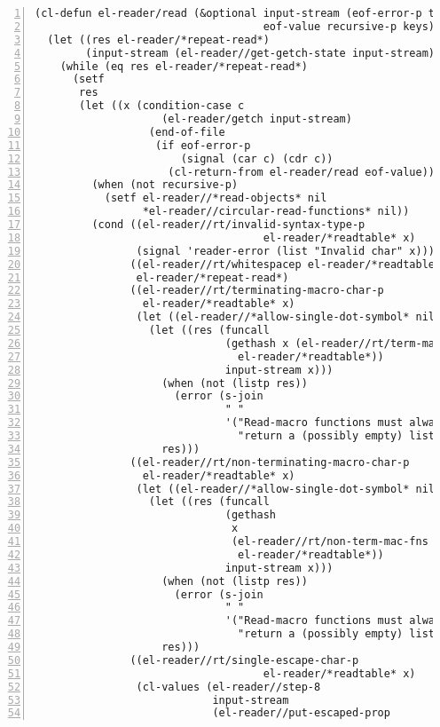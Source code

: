 \documentclass[a4paper,10pt,twoside]{report}
\begin{document}
\begin{lstlisting}[style=lispcode,label={code:read-algo},caption={Code for the
    reader algorithm.},numbers=left]
(cl-defun el-reader/read (&optional input-stream (eof-error-p t)
                                    eof-value recursive-p keys)
  (let ((res el-reader/*repeat-read*)
        (input-stream (el-reader//get-getch-state input-stream)))
    (while (eq res el-reader/*repeat-read*)
      (setf
       res
       (let ((x (condition-case c
                    (el-reader/getch input-stream)
                  (end-of-file
                   (if eof-error-p
                       (signal (car c) (cdr c))
                     (cl-return-from el-reader/read eof-value))))))
         (when (not recursive-p)
           (setf el-reader//*read-objects* nil
                 *el-reader//circular-read-functions* nil))
         (cond ((el-reader//rt/invalid-syntax-type-p
                                    el-reader/*readtable* x)
                (signal 'reader-error (list "Invalid char" x)))
               ((el-reader//rt/whitespacep el-reader/*readtable* x)
                el-reader/*repeat-read*)
               ((el-reader//rt/terminating-macro-char-p
                 el-reader/*readtable* x)
                (let ((el-reader//*allow-single-dot-symbol* nil))
                  (let ((res (funcall
                              (gethash x (el-reader//rt/term-mac-fns
                                el-reader/*readtable*))
                              input-stream x)))
                    (when (not (listp res))
                      (error (s-join
                              " "
                              '("Read-macro functions must always"
                                "return a (possibly empty) list."))))
                    res)))
               ((el-reader//rt/non-terminating-macro-char-p
                 el-reader/*readtable* x)
                (let ((el-reader//*allow-single-dot-symbol* nil))
                  (let ((res (funcall
                              (gethash
                               x
                               (el-reader//rt/non-term-mac-fns
                                el-reader/*readtable*))
                              input-stream x)))
                    (when (not (listp res))
                      (error (s-join
                              " "
                              '("Read-macro functions must always"
                                "return a (possibly empty) list."))))
                    res)))
               ((el-reader//rt/single-escape-char-p
                                    el-reader/*readtable* x)
                (cl-values (el-reader//step-8
                            input-stream
                            (el-reader//put-escaped-prop

\end{lstlisting}
\end{document}
